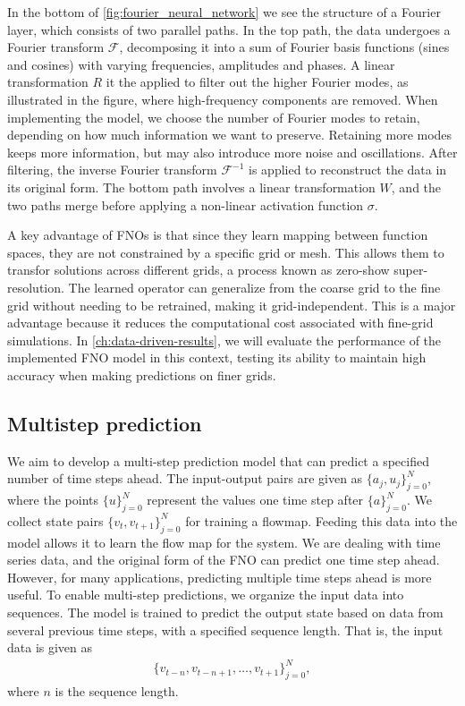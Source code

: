 In the bottom of \autoref{fig:fourier_neural_network} we see the structure of a Fourier layer, which consists of two parallel paths.
In the top path, the data undergoes a Fourier transform $\mathcal{F}$, decomposing it into a sum of Fourier basis functions (sines and cosines) with varying frequencies, amplitudes and phases.
A linear transformation $R$ it the applied to filter out the higher Fourier modes, as illustrated in the figure, where high-frequency components are removed.
When implementing the model, we choose the number of Fourier modes to retain, depending on how much information we want to preserve.
Retaining more modes keeps more information, but may also introduce more noise and oscillations.
After filtering, the inverse Fourier transform $\mathcal{F}^{-1}$ is applied to reconstruct the data in its original form.
The bottom path involves a linear transformation $W$, and the two paths merge before applying a non-linear activation function $\sigma$.

A key advantage of FNOs is that since they learn mapping between function spaces, they are not constrained by a specific grid or mesh.
This allows them to transfor solutions across different grids, a process known as zero-show super-resolution.
The learned operator can generalize from the coarse grid to the fine grid without needing to be retrained, making it grid-independent.
This is a major advantage because it reduces the computational cost associated with fine-grid simulations.
In \autoref{ch:data-driven-results}, we will evaluate the performance of the implemented FNO model in this context, testing its ability to maintain high accuracy when making predictions on finer grids.

\subsection*{Multistep prediction}
We aim to develop a multi-step prediction model that can predict a specified number of time steps ahead.
The input-output pairs are given as $\{a_j, u_j\}_{j=0}^N$, where the points $\{u\}_{j=0}^N$ represent the values one time step after $\{a\}_{j=0}^N$.
We collect state pairs $\{v_t, v_{t+1}\}_{j=0}^N$ for training a flowmap.
Feeding this data into the model allows it to learn the flow map for the system.
We are dealing with time series data, and the original form of the FNO can predict one time step ahead.
However, for many applications, predicting multiple time steps ahead is more useful.
To enable multi-step predictions, we organize the input data into sequences.
The model is trained to predict the output state based on data from several previous time steps, with a specified sequence length.
That is, the input data is given as
\begin{align*}
    \{v_{t-n}, v_{t-n+1}, \dots, v_{t+1}\}_{j=0}^N,
\end{align*}
where $n$ is the sequence length.


